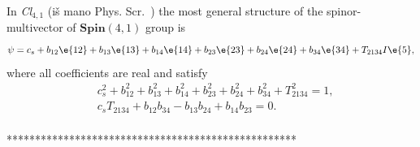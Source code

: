 

\vspace{5mm}\noindent{}  In \textit{Cl}$_{4,1}$ (i{\v s} mano
Phys. Scr.~\cite{Dargys10bCL}) the most general structure of the
spinor-multivector of $\mathbf{Spin}(4,1)$  group is
\begin{equation}
\psi=c_s+b_{12}\e{12}+b_{13}\e{13}+b_{14}\e{14}+b_{23}\e{23}+b_{24}\e{24}+b_{34}\e{34}+T_{2134}I\e{5},
\end{equation}
where all coefficients are real and satisfy
\[\begin{split}
&c_s^2+b_{12}^2+b_{13}^2+b_{14}^2+b_{23}^2+b_{24}^2+b_{34}^2+T_{2134}^2=1,\\
&c_s T_{2134}+b_{12}b_{34}-b_{13}b_{24}+b_{14}b_{23}=0.\\
\end{split}\]


***************************************************

